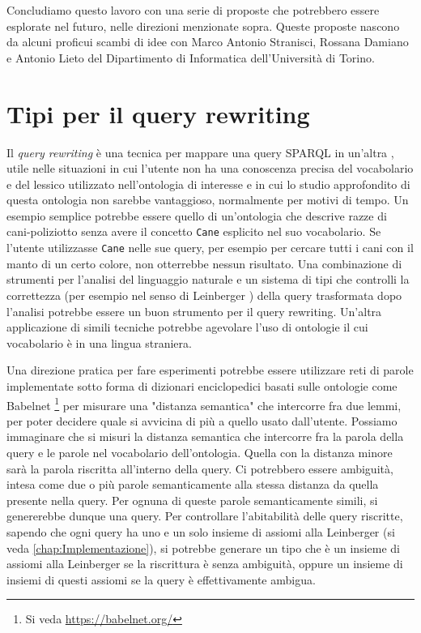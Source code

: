 Concludiamo questo lavoro con una serie di proposte che potrebbero essere esplorate nel futuro, nelle direzioni menzionate sopra. Queste proposte 
nascono da alcuni proficui scambi di idee con Marco Antonio Stranisci, Rossana Damiano e Antonio Lieto del Dipartimento di Informatica dell'Università 
di Torino.

\section{Tipi per il query rewriting}
Il \textit{query rewriting} è una tecnica per mappare una query SPARQL in un'altra \cite{fQuery}, utile nelle situazioni in cui l'utente non ha una conoscenza precisa del vocabolario e 
del lessico utilizzato nell'ontologia di interesse e in cui lo studio approfondito di questa ontologia non sarebbe vantaggioso, normalmente per motivi di tempo. Un esempio semplice potrebbe essere quello di un'ontologia che descrive razze di cani-poliziotto senza avere il concetto \texttt{Cane} esplicito nel suo vocabolario.
Se l'utente utilizzasse \texttt{Cane} nelle sue query, per esempio per cercare tutti i cani con il manto di un certo colore, non otterrebbe nessun risultato. Una combinazione di strumenti per l'analisi del linguaggio naturale e un sistema di tipi che controlli la correttezza (per esempio nel senso di Leinberger \cite{leinbergerphdthesis}) della query trasformata  dopo l'analisi potrebbe essere un buon strumento per il query rewriting. Un'altra applicazione di simili tecniche potrebbe agevolare l'uso di ontologie il cui vocabolario è in una lingua straniera.

Una direzione pratica per fare esperimenti potrebbe essere utilizzare reti di parole implementate sotto forma di dizionari enciclopedici 
basati sulle ontologie come Babelnet \footnote{Si veda \url{https://babelnet.org/}} per misurare una "distanza semantica"  che intercorre fra due lemmi, per poter decidere quale si avvicina di più a quello usato dall'utente. Possiamo immaginare che si misuri la distanza semantica che intercorre fra la parola della query e le parole nel vocabolario dell'ontologia. Quella con la distanza minore sarà la parola riscritta all'interno della query. Ci potrebbero essere ambiguità, intesa come due o più parole semanticamente alla stessa distanza da quella presente nella query. Per ognuna di queste parole semanticamente simili, si genererebbe dunque una query.
Per controllare l'abitabilità delle query riscritte, sapendo che ogni query ha uno e un solo insieme di assiomi alla Leinberger (si veda \autoref{chap:Implementazione}), si potrebbe generare un tipo che è un insieme di assiomi alla Leinberger se la riscrittura è senza ambiguità, oppure un insieme di insiemi di questi assiomi se la query è effettivamente ambigua.

